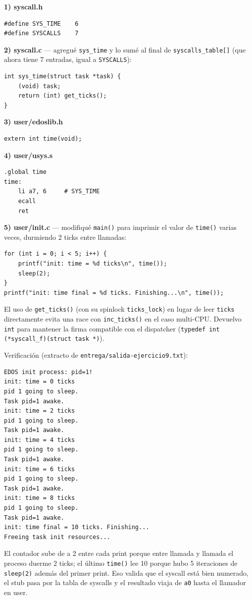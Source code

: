 \documentclass[11pt,a4paper]{article}
\begin{document}
\textbf{1) syscall.h}
\begin{lstlisting}[style=cstyle]
#define SYS_TIME    6
#define SYSCALLS    7
\end{lstlisting}

\textbf{2) syscall.c} --- agregué \texttt{sys\_time} y lo sumé al final de
\texttt{syscalls\_table[]} (que ahora tiene 7 entradas, igual a
\texttt{SYSCALLS}):
\begin{lstlisting}[style=cstyle]
int sys_time(struct task *task) {
    (void) task;
    return (int) get_ticks();
}
\end{lstlisting}

\textbf{3) user/edoslib.h}
\begin{lstlisting}[style=cstyle]
extern int time(void);
\end{lstlisting}

\textbf{4) user/usys.s}
\begin{lstlisting}[style=cstyle]
.global time
time:
    li a7, 6     # SYS_TIME
    ecall
    ret
\end{lstlisting}

\textbf{5) user/init.c} --- modifiqué \texttt{main()} para imprimir el valor de
\texttt{time()} varias veces, durmiendo 2 ticks entre llamadas:
\begin{lstlisting}[style=cstyle]
for (int i = 0; i < 5; i++) {
    printf("init: time = %d ticks\n", time());
    sleep(2);
}
printf("init: time final = %d ticks. Finishing...\n", time());
\end{lstlisting}

El uso de \texttt{get\_ticks()} (con su spinlock \texttt{ticks\_lock}) en lugar de
leer \texttt{ticks} directamente evita una race con \texttt{inc\_ticks()} en el
caso multi-CPU. Devuelvo \texttt{int} para mantener la firma compatible con el
dispatcher (\texttt{typedef int (*syscall\_f)(struct task *)}).

Verificación (extracto de \texttt{entrega/salida-ejercicio9.txt}):

\begin{lstlisting}[style=textstyle]
EDOS init process: pid=1!
init: time = 0 ticks
pid 1 going to sleep.
Task pid=1 awake.
init: time = 2 ticks
pid 1 going to sleep.
Task pid=1 awake.
init: time = 4 ticks
pid 1 going to sleep.
Task pid=1 awake.
init: time = 6 ticks
pid 1 going to sleep.
Task pid=1 awake.
init: time = 8 ticks
pid 1 going to sleep.
Task pid=1 awake.
init: time final = 10 ticks. Finishing...
Freeing task init resources...
\end{lstlisting}

El contador sube de a 2 entre cada print porque entre llamada y llamada el
proceso duerme 2 ticks; el último \texttt{time()} lee 10 porque hubo 5
iteraciones de \texttt{sleep(2)} además del primer print. Eso valida que el
syscall está bien numerado, el stub pasa por la tabla de syscalls y el resultado
viaja de \texttt{a0} hasta el llamador en user.
\end{document}
